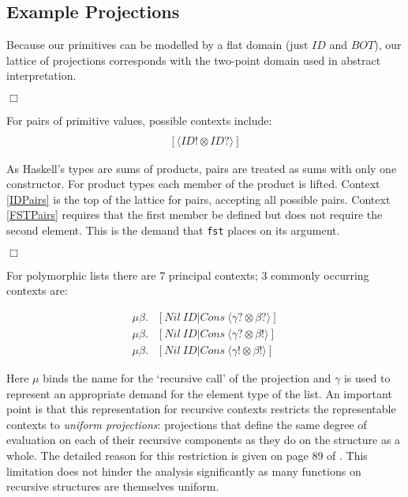 \documentclass[preprint]{sigplanconf}
\begin{document}
\subsection*{Example Projections}

Because our primitives can be modelled by a flat domain (just $ID$ and $BOT$),
our lattice of projections corresponds with the two-point domain used in
abstract interpretation.

\hfill$\Box$

For pairs of primitive values, possible contexts include:
\begin{align}
[\langle ID? \otimes ID? \rangle] \label{IDPairs} \\
[\langle ID! \otimes ID? \rangle] \label{FSTPairs}
\end{align}


As Haskell's types are sums of products, pairs are treated as sums with only
one constructor.  For product types each member of the product is lifted.
Context \ref{IDPairs} is the top of the lattice for pairs, accepting all
possible pairs. Context \ref{FSTPairs} requires that the first member be
defined but does not require the second element. This is the demand that
\verb-fst- places on its argument.

\hfill$\Box$

For polymorphic lists there are 7 principal contexts; 3 commonly occurring contexts are:

\begin{align}
    \mu\beta.&[Nil\ ID | Cons\ \langle \gamma? \otimes \beta?\rangle] \label{IDList} \\
    \mu\beta.&[Nil\ ID | Cons\ \langle \gamma? \otimes \beta!\rangle] \label{FINList} \\
    \mu\beta.&[Nil\ ID | Cons\ \langle \gamma! \otimes \beta!\rangle] \label{FULLList}
\end{align}


Here $\mu$ binds the name for the `recursive call' of the projection and
$\gamma$ is used to represent an appropriate demand for the element type of the
list.  An important point is that this representation for recursive contexts
restricts the representable contexts to \emph{uniform projections}: projections
that define the same degree of evaluation on each of their recursive components
as they do on the structure as a whole. The detailed reason for this
restriction is given on page 89 of \cite{hinze1995projection}. This limitation
does not hinder the analysis significantly as many functions on recursive
structures are themselves uniform.
\end{document}
